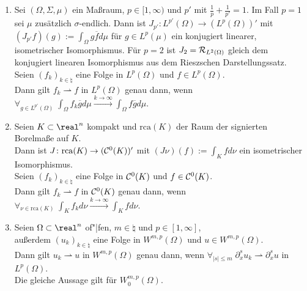 \linie

\begin{Bsp}
    \begin{enumerate}[label=\emph{(\alph*)}]
        \item
        Sei $(\Omega, \Sigma, \mu)$ ein Maßraum, $p \in [1, \infty)$ und
        $p'$ mit $\frac{1}{p} + \frac{1}{p'} = 1$.
        Im Fall $p = 1$ sei $\mu$ zusätzlich $\sigma$-endlich.
        Dann ist $J_{p'}\colon L^{p'}(\Omega) \rightarrow (L^p(\Omega))'$ mit
        $(J_{p'} f)(g) := \int_\Omega g\overline{f} d\mu$ für $g \in L^p(\mu)$
        ein konjugiert linearer, isometrischer Isomorphismus.
        Für $p = 2$ ist $J_2 = \mathcal{R}_{L^2(\Omega)}$ gleich dem
        konjugiert linearen Isomorphismus aus dem Rieszschen Darstellungssatz.\\
        Seien $(f_k)_{k \in \natural}$ eine Folge in $L^p(\Omega)$ und $f \in L^p(\Omega)$.\\
        Dann gilt $f_k \rightharpoonup f$ in $L^p(\Omega)$ genau dann,
        wenn $\forall_{g \in L^{p'}(\Omega)}\; \int_\Omega f_k \overline{g} d\mu
        \xrightarrow{k \to \infty} \int_\Omega f\overline{g} d\mu$.

        \item
        Seien $K \subset \real^n$ kompakt und
        $\text{rca}(K)$ der Raum der signierten Borelmaße auf $K$.\\
        Dann ist $J\colon \text{rca}(K) \rightarrow (\mathcal{C}^0(K))'$ mit
        $(J\nu)(f) := \int_K fd\nu$ ein isometrischer Isomorphismus.\\
        Seien $(f_k)_{k \in \natural}$ eine Folge in $\mathcal{C}^0(K)$ und $f \in \mathcal{C}^0(K)$.\\
        Dann gilt $f_k \rightharpoonup f$ in $\mathcal{C}^0(K)$ genau dann,
        wenn $\forall_{\nu \in \text{rca}(K)}\; \int_K f_k d\nu
        \xrightarrow{k \to \infty} \int_K f d\nu$.

        \item
        Seien $\Omega \subset \real^n$ of"|fen, $m \in \natural$ und $p \in [1, \infty]$,\\
        außerdem $(u_k)_{k \in \natural}$ eine
        Folge in $W^{m,p}(\Omega)$ und $u \in W^{m,p}(\Omega)$.\\
        Dann gilt $u_k \rightharpoonup u$ in $W^{m,p}(\Omega)$ genau dann,
        wenn $\forall_{|s| \le m}\; \partial_x^s u_k \rightharpoonup \partial_x^s u$
        in $L^p(\Omega)$.\\
        Die gleiche Aussage gilt für $W^{m,p}_0(\Omega)$.
    \end{enumerate}
\end{Bsp}

